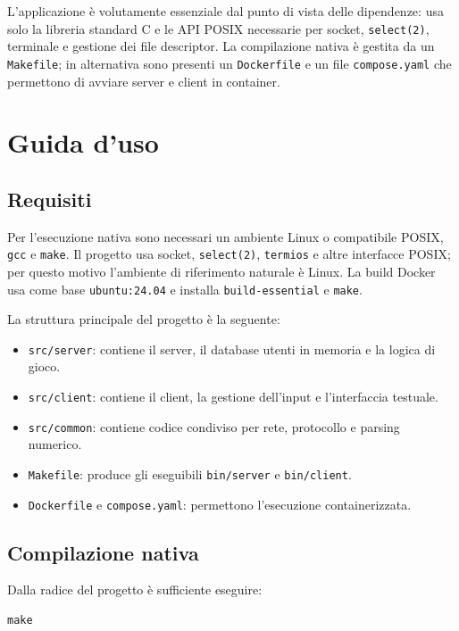 \documentclass[11pt,a4paper]{article}
\begin{document}
L'applicazione è volutamente essenziale dal punto di vista delle dipendenze: usa solo la libreria standard C e le API POSIX necessarie per socket, \texttt{select(2)}, terminale e gestione dei file descriptor. La compilazione nativa è gestita da un \texttt{Makefile}; in alternativa sono presenti un \texttt{Dockerfile} e un file \texttt{compose.yaml} che permettono di avviare server e client in container.

\section{Guida d'uso}

\subsection{Requisiti}

Per l'esecuzione nativa sono necessari un ambiente Linux o compatibile POSIX, \texttt{gcc} e \texttt{make}. Il progetto usa socket, \texttt{select(2)}, \texttt{termios} e altre interfacce POSIX; per questo motivo l'ambiente di riferimento naturale è Linux. La build Docker usa come base \texttt{ubuntu:24.04} e installa \texttt{build-essential} e \texttt{make}.

La struttura principale del progetto è la seguente:

\begin{itemize}
  \item \texttt{src/server}: contiene il server, il database utenti in memoria e la logica di gioco.
  \item \texttt{src/client}: contiene il client, la gestione dell'input e l'interfaccia testuale.
  \item \texttt{src/common}: contiene codice condiviso per rete, protocollo e parsing numerico.
  \item \texttt{Makefile}: produce gli eseguibili \texttt{bin/server} e \texttt{bin/client}.
  \item \texttt{Dockerfile} e \texttt{compose.yaml}: permettono l'esecuzione containerizzata.
\end{itemize}

\subsection{Compilazione nativa}

Dalla radice del progetto è sufficiente eseguire:

\begin{lstlisting}[style=textstyle]
make
\end{lstlisting}
\end{document}
